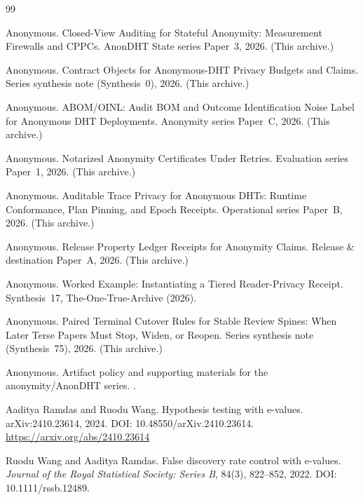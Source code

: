 \documentclass[11pt]{article}
\theoremstyle{definition}
\theoremstyle{remark}
\begin{document}
\begin{thebibliography}{99}

Anonymous.
\newblock Closed-View Auditing for Stateful Anonymity: Measurement Firewalls and CPPCs.
\newblock AnonDHT State series Paper~3, 2026. (This archive.)

Anonymous.
\newblock Contract Objects for Anonymous-DHT Privacy Budgets and Claims.
\newblock Series synthesis note (Synthesis~0), 2026. (This archive.)

Anonymous.
\newblock ABOM/OINL: Audit BOM and Outcome Identification Noise Label for Anonymous DHT Deployments.
\newblock Anonymity series Paper~C, 2026. (This archive.)

Anonymous.
\newblock Notarized Anonymity Certificates Under Retries.
\newblock Evaluation series Paper~1, 2026. (This archive.)

Anonymous.
\newblock Auditable Trace Privacy for Anonymous DHTs: Runtime Conformance, Plan Pinning, and Epoch Receipts.
\newblock Operational series Paper~B, 2026. (This archive.)

Anonymous.
\newblock Release Property Ledger Receipts for Anonymity Claims.
\newblock Release \& destination Paper~A, 2026. (This archive.)

Anonymous.
\newblock Worked Example: Instantiating a Tiered Reader-Privacy Receipt.
\newblock Synthesis~17, The-One-True-Archive (2026).

Anonymous.
\newblock Paired Terminal Cutover Rules for Stable Review Spines: When Later Terse Papers Must Stop, Widen, or Reopen.
\newblock Series synthesis note (Synthesis~75), 2026. (This archive.)

Anonymous.
\newblock Artifact policy and supporting materials for the anonymity/AnonDHT series.
.

Aaditya Ramdas and Ruodu Wang.
\newblock Hypothesis testing with e-values.
\newblock arXiv:2410.23614, 2024. DOI: 10.48550/arXiv.2410.23614.
\newblock \url{https://arxiv.org/abs/2410.23614}

Ruodu Wang and Aaditya Ramdas.
\newblock False discovery rate control with e-values.
\newblock \emph{Journal of the Royal Statistical Society: Series B}, 84(3), 822--852, 2022.
\newblock DOI: 10.1111/rssb.12489.


\end{thebibliography}
\end{document}
